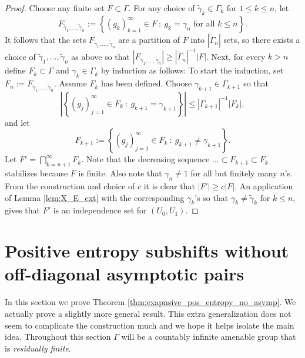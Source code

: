 \documentclass[oneside,english]{amsart}
\theoremstyle{definition}
\begin{document}
\begin{proof}
Choose any finite set $F \subset \Gamma$.
For any choice of   $\tilde \gamma_k \in \Gamma_k$ for $1 \le k \le n$, let
$$F_{\tilde \gamma_1,\ldots,\tilde \gamma_n} := \left\{(g_k)_{k=1}^\infty \in  F~:~ g_k = \gamma_n \mbox{ for all } k\le n  \right\}.$$
It follows that  the sets $F_{\tilde \gamma_1,\ldots,\tilde \gamma_n}$ are a partition of $F$ into $|\tilde \Gamma_n|$ sets, so there exists a choice of $\tilde \gamma_1,\ldots,\tilde \gamma_n$ as above so that
$|F_{\tilde \gamma_1,\ldots,\tilde \gamma_n} | \ge |\tilde \Gamma_n|^{-1} |F|$.
Next, for every $k > n$ define $F_k \subset \Gamma$ and $\gamma_k \in \Gamma_k$ by induction as follows:
To start the induction, set $F_n := F_{\tilde \gamma_1,\ldots,\tilde \gamma_n}$.  Assume $F_k$ has been defined. Choose $\gamma_{k+1} \in \Gamma_{k+1}$ so that
$$\left|  \left\{(g_j)_{j=1}^\infty \in  F_k~:~ g_{k+1}=\gamma_{k+1}\right\}\right| \le |\Gamma_{k+1}|^{-1} |F_k|,$$
and let
$$F_{k+1} :=   \left\{(g_j)_{j=1}^\infty \in  F_k~:~ g_{k+1}\ne\gamma_{k+1}\right\}.$$
Let $F' = \bigcap_{k=n+1}^\infty F_k$.
Note that  the decreasing sequence $\ldots \subset F_{k+1} \subset F_k$ stabilizes because $F$ is finite. Also note that $\gamma_n \ne 1$ for all but finitely many $n$'s.
From the construction and choice of $c$ it is clear that
$|F'| \ge c |F|$. An application of  Lemma \ref{lem:X_E_ext} with the corresponding $\gamma_k$'s so that $\gamma_k \ne \tilde \gamma_k$ for $k \le n$, gives that $F'$ is an independence set for $(U_0,U_1)$.
\end{proof}

\section{Positive entropy subshifts without off-diagonal  asymptotic pairs}\label{sec:positive_exp_no_asymp}


In this section we prove Theorem \ref{thm:exapnsive_pos_entropy_no_asymp}.
We actually prove a slightly more general result.
This extra generalization does not seem to complicate the construction much and we hope it  helps isolate the main idea.
Throughout this section $\Gamma$ will be  a countably infinite  amenable group that is \emph{residually finite}.
\end{document}
